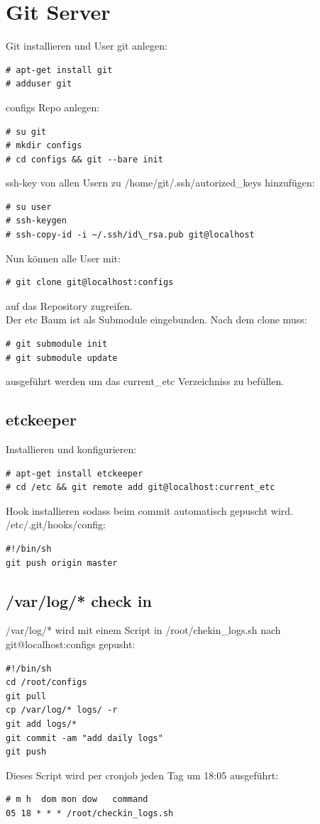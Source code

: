 \section{Git Server}
Git installieren und User git anlegen:
\begin{lstlisting}[style=Bash]
# apt-get install git
# adduser git
\end{lstlisting}
configs Repo anlegen:
\begin{lstlisting}[style=Bash]
# su git
# mkdir configs
# cd configs && git --bare init
\end{lstlisting}
ssh-key von allen Usern zu /home/git/.ssh/autorized\_keys hinzufügen:
\begin{lstlisting}[style=Bash]
# su user
# ssh-keygen
# ssh-copy-id -i ~/.ssh/id\_rsa.pub git@localhost
\end{lstlisting}
Nun können alle User mit:
\begin{lstlisting}[style=Bash]
# git clone git@localhost:configs
\end{lstlisting}
auf das Repository zugreifen.\\
Der etc Baum ist als Submodule eingebunden. Nach dem clone muss:
\begin{lstlisting}[style=Bash]
# git submodule init
# git submodule update
\end{lstlisting}
ausgeführt werden um das current\_etc Verzeichniss zu befüllen.
\subsection{etckeeper}
Installieren und konfigurieren:
\begin{lstlisting}[style=Bash]
# apt-get install etckeeper
# cd /etc && git remote add git@localhost:current_etc
\end{lstlisting}
Hook installieren sodass beim commit automatisch gepuscht wird.\\
/etc/.git/hooks/config:
\begin{lstlisting}[style=Bash]
#!/bin/sh
git push origin master
\end{lstlisting}

\subsection{/var/log/* check in}
/var/log/* wird mit einem Script in /root/chekin\_logs.sh nach git@localhost:configs gepusht:
\begin{lstlisting}[style=Bash]
#!/bin/sh
cd /root/configs
git pull
cp /var/log/* logs/ -r
git add logs/*
git commit -am "add daily logs"
git push
\end{lstlisting}
Dieses Script wird per cronjob jeden Tag um 18:05 ausgeführt:
\begin{lstlisting}[style=Bash]
# m h  dom mon dow   command
05 18 * * * /root/checkin_logs.sh
\end{lstlisting}
